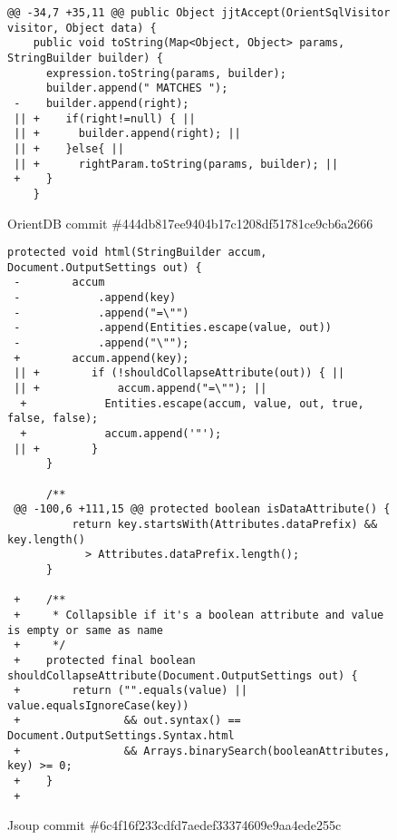 \lstset{language=Java}

\begin{figure*}
\begin{lstlisting}[moredelim={[is][keywordstyle]{||}{||}}]
@@ -34,7 +35,11 @@ public Object jjtAccept(OrientSqlVisitor visitor, Object data) {
    public void toString(Map<Object, Object> params, StringBuilder builder) {
      expression.toString(params, builder);
      builder.append(" MATCHES ");
 -    builder.append(right);
 || +    if(right!=null) { ||  
 || +      builder.append(right); ||
 || +    }else{ ||
 || +      rightParam.toString(params, builder); ||
 +    }
    }
\end{lstlisting}
\caption{OrientDB commit \#444db817ee9404b17c1208df51781ce9cb6a2666\label{fig:orient}}
\end{figure*}

\begin{figure*}
\begin{lstlisting}[moredelim={[is][keywordstyle]{||}{||}}]
     protected void html(StringBuilder accum, Document.OutputSettings out) {
 -        accum
 -            .append(key)
 -            .append("=\"")
 -            .append(Entities.escape(value, out))
 -            .append("\"");
 +        accum.append(key);
 || +        if (!shouldCollapseAttribute(out)) { ||
 || +            accum.append("=\""); ||
  +            Entities.escape(accum, value, out, true, false, false);
  +            accum.append('"');
 || +        }
      }
  
      /**
 @@ -100,6 +111,15 @@ protected boolean isDataAttribute() {
          return key.startsWith(Attributes.dataPrefix) && key.length() 
            > Attributes.dataPrefix.length();
      }
  
 +    /**
 +     * Collapsible if it's a boolean attribute and value is empty or same as name
 +     */
 +    protected final boolean shouldCollapseAttribute(Document.OutputSettings out) {
 +        return ("".equals(value) || value.equalsIgnoreCase(key))
 +                && out.syntax() == Document.OutputSettings.Syntax.html
 +                && Arrays.binarySearch(booleanAttributes, key) >= 0;
 +    }
 +
 \end{lstlisting}
\caption{Jsoup commit \#6c4f16f233cdfd7aedef33374609e9aa4ede255c\label{fig:jsoup}}
\end{figure*}